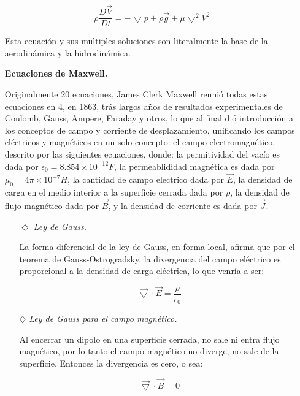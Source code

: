 \documentclass[12pt,letterpaper]{article}
\begin{document}
\begin{itemize}
    $$\rho \frac{D\vec{V}}{Dt}=-\bigtriangledown  p+\rho \vec{g}+\mu \bigtriangledown^{2}V^{2}$$

    Esta ecuación y sus multiples soluciones son literalmente la base de la aerodinámica y la hidrodinámica.\newline
    
    \item[] \textbf{Ecuaciones de Maxwell.}\newline
    
    Originalmente 20 ecuaciones, James Clerk Maxwell reunió todas estas ecuaciones en 4, en 1863, trás largos años de resultados experimentales de Coulomb, Gauss, Ampere, Faraday y otros, lo que al final dió introducción a los conceptos de campo y corriente de desplazamiento, unificando los campos eléctricos y magnéticos en un solo concepto: el campo electromagnético, descrito por las siguientes ecuaciones, donde: la permitividad del vacío es dada por $\epsilon_{0}=8.854\times 10^{-12} F$, la permeablididad magnética es dada por $\mu_{0}=4\pi \times 10^{-7} H$, la cantidad de campo electrico dada por $\vec{E}$, la densidad de carga en el medio interior a la superficie cerrada dada por $\rho$, la densidad de flujo magnético dada por $\vec{B}$, y la densidad de corriente es dada por $\vec{J}$.\newline

        \begin{itemize}
        
            \item[$\Diamond$] \textit{Ley de Gauss.}\newline

            La forma diferencial de la ley de Gauss, en forma local, afirma que por el teorema de Gauss-Ostrogradsky, la divergencia del campo eléctrico es proporcional a la densidad de carga eléctrica, lo que venría a ser:
            
            $$\vec{\bigtriangledown} \cdot \vec{E}=\frac{\rho}{\epsilon_{0}}$$
            
            \item[$\diamondsuit$] \textit{Ley de Gauss para el campo magnético.}\newline

            Al encerrar un dipolo en una superficie cerrada, no sale ni entra flujo magnético, por lo tanto el campo magnético no diverge, no sale de la superficie. Entonces la divergencia es cero, o sea:
            
            $$\vec{\bigtriangledown} \cdot \vec{B}=0$$
            

\end{itemize}
\end{itemize}
\end{document}
